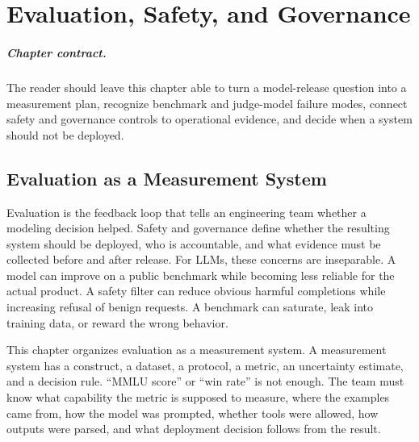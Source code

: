 \chapter{Evaluation, Safety, and Governance}
\label{ch:evaluation-safety-governance}


\paragraph{Chapter contract.} The reader should leave this chapter able to turn a model-release question into a measurement plan, recognize benchmark and judge-model failure modes, connect safety and governance controls to operational evidence, and decide when a system should not be deployed.

\section{Evaluation as a Measurement System}
Evaluation is the feedback loop that tells an engineering team whether a modeling decision helped. Safety and governance define whether the resulting system should be deployed, who is accountable, and what evidence must be collected before and after release. For LLMs, these concerns are inseparable. A model can improve on a public benchmark while becoming less reliable for the actual product. A safety filter can reduce obvious harmful completions while increasing refusal of benign requests. A benchmark can saturate, leak into training data, or reward the wrong behavior.

This chapter organizes evaluation as a measurement system. A measurement system has a construct, a dataset, a protocol, a metric, an uncertainty estimate, and a decision rule. ``MMLU score'' or ``win rate'' is not enough. The team must know what capability the metric is supposed to measure, where the examples came from, how the model was prompted, whether tools were allowed, how outputs were parsed, and what deployment decision follows from the result.

